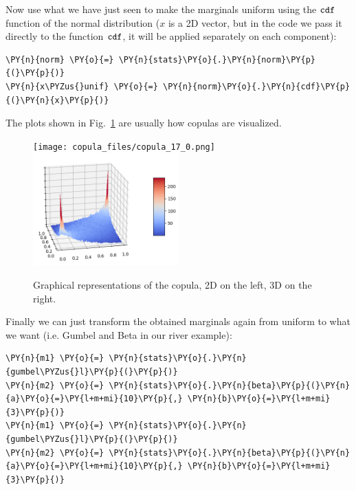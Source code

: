 Now use what we have just seen to make the marginals uniform using
the \(\tt{cdf}\) function of the normal distribution ($x$ is a 2D
vector, but in the code we pass it directly to the function \(\tt{cdf}\),
it will be applied separately on each component):

\begin{tcolorbox}[breakable, size=fbox, boxrule=1pt, pad at break*=1mm,colback=cellbackground, colframe=cellborder]
\begin{Verbatim}[commandchars=\\\{\}]
\PY{n}{norm} \PY{o}{=} \PY{n}{stats}\PY{o}{.}\PY{n}{norm}\PY{p}{(}\PY{p}{)}
\PY{n}{x\PYZus{}unif} \PY{o}{=} \PY{n}{norm}\PY{o}{.}\PY{n}{cdf}\PY{p}{(}\PY{n}{x}\PY{p}{)}
\end{Verbatim}
\end{tcolorbox}

The plots shown in Fig.~\ref{fig:copula} are usually how copulas are visualized.

\begin{figure}[htb]
\centering
\texttt{[image: copula\_files/copula\_17\_0.png]}
\quad
\includegraphics[width=0.5\textwidth]{copula_3d.png}
\caption{Graphical representations of the copula, 2D on the left, 3D on the right.}
\label{fig:copula}
\end{figure}

Finally we can just transform the obtained marginals again from uniform to what we want
(i.e. Gumbel and Beta in our river example):

\begin{tcolorbox}[breakable, size=fbox, boxrule=1pt, pad at break*=1mm,colback=cellbackground, colframe=cellborder]
\begin{Verbatim}[commandchars=\\\{\}]
\PY{n}{m1} \PY{o}{=} \PY{n}{stats}\PY{o}{.}\PY{n}{gumbel\PYZus{}l}\PY{p}{(}\PY{p}{)}
\PY{n}{m2} \PY{o}{=} \PY{n}{stats}\PY{o}{.}\PY{n}{beta}\PY{p}{(}\PY{n}{a}\PY{o}{=}\PY{l+m+mi}{10}\PY{p}{,} \PY{n}{b}\PY{o}{=}\PY{l+m+mi}{3}\PY{p}{)}
\PY{n}{m1} \PY{o}{=} \PY{n}{stats}\PY{o}{.}\PY{n}{gumbel\PYZus{}l}\PY{p}{(}\PY{p}{)}
\PY{n}{m2} \PY{o}{=} \PY{n}{stats}\PY{o}{.}\PY{n}{beta}\PY{p}{(}\PY{n}{a}\PY{o}{=}\PY{l+m+mi}{10}\PY{p}{,} \PY{n}{b}\PY{o}{=}\PY{l+m+mi}{3}\PY{p}{)}
\end{Verbatim}
\end{tcolorbox}

